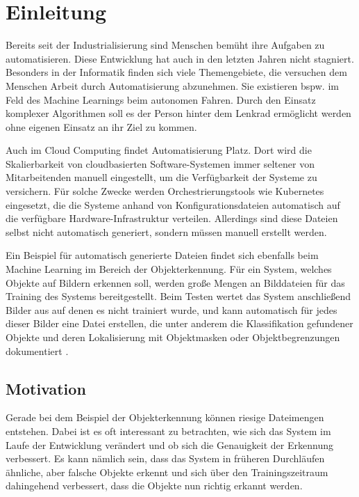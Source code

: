 \section{Einleitung} 
Bereits seit der Industrialisierung sind Menschen bemüht ihre Aufgaben zu automatisieren. Diese Entwicklung hat auch in den letzten Jahren nicht stagniert. Besonders in der Informatik finden sich viele Themengebiete, die versuchen dem Menschen Arbeit durch Automatisierung abzunehmen. Sie existieren bspw. im Feld des Machine Learnings beim autonomen Fahren. Durch den Einsatz komplexer Algorithmen soll es der Person hinter dem Lenkrad ermöglicht werden ohne eigenen Einsatz an ihr Ziel zu kommen.

Auch im Cloud Computing findet Automatisierung Platz. Dort wird die Skalierbarkeit von cloudbasierten Software-Systemen immer seltener von Mitarbeitenden manuell eingestellt, um die Verfügbarkeit der Systeme zu versichern. Für solche Zwecke werden Orchestrierungstools wie Kubernetes eingesetzt, die die Systeme anhand von Konfigurationsdateien automatisch auf die verfügbare Hardware-Infrastruktur verteilen. Allerdings sind diese Dateien selbst nicht automatisch generiert, sondern müssen manuell erstellt werden.

Ein Beispiel für automatisch generierte Dateien findet sich ebenfalls beim Machine Learning im Bereich der Objekterkennung. Für ein System, welches Objekte auf Bildern erkennen soll, werden große Mengen an Bilddateien für das Training des Systems bereitgestellt. Beim Testen wertet das System anschließend Bilder aus auf denen es nicht trainiert wurde, und kann automatisch für jedes dieser Bilder eine Datei erstellen, die unter anderem die Klassifikation gefundener Objekte und deren Lokalisierung mit Objektmasken oder Objektbegrenzungen dokumentiert \autocite[]{coco-article}\autocite[]{cocoOutput}. 

\subsection{Motivation}
Gerade bei dem Beispiel der Objekterkennung können riesige Dateimengen entstehen. Dabei ist es oft interessant zu betrachten, wie sich das System im Laufe der Entwicklung verändert und ob sich die Genauigkeit der Erkennung verbessert. Es kann nämlich sein, dass das System in früheren Durchläufen ähnliche, aber falsche Objekte erkennt und sich über den Trainingszeitraum dahingehend verbessert, dass die Objekte nun richtig erkannt werden.

